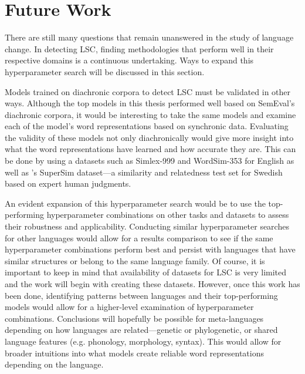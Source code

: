 \section{Future Work}
\label{sec:futurework}

There are still many questions that remain unanswered in the study of language change. In detecting LSC, finding methodologies that perform well in their respective domains is a continuous undertaking. Ways to expand this hyperparameter search will be discussed in this section.

Models trained on diachronic corpora to detect LSC must be validated in other ways. Although the top models in this thesis performed well based on SemEval’s diachronic corpora, it would be interesting to take the same models and examine each of the model’s word representations based on synchronic data. Evaluating the validity of these models not only diachronically would give more insight into what the word representations have learned and how accurate they are. This can be done by using a datasets such as Simlex-999 \citep{hill-reichart-simlex999} and WordSim-353 \citep{finkelstein-wordsim2001} for English as well as \citet{supersim2021}'s SuperSim dataset—a similarity and relatedness test set for Swedish based on expert human judgments. 

An evident expansion of this hyperparameter search would be to use the top-performing hyperparameter combinations on other tasks and datasets to assess their robustness and applicability. Conducting similar hyperparameter searches for other languages would allow for a results comparison to see if the same hyperparameter combinations perform best and persist with languages that have similar structures or belong to the same language family. Of course, it is important to keep in mind that availability of datasets for LSC is very limited and the work will begin with creating these datasets. However, once this work has been done, identifying patterns between languages and their top-performing models would allow for a higher-level examination of hyperparameter combinations. Conclusions will hopefully be possible for meta-languages depending on how languages are related—genetic or phylogenetic, or shared language features (e.g. phonology, morphology, syntax). This would allow for broader intuitions into what models create reliable word representations depending on the language.

